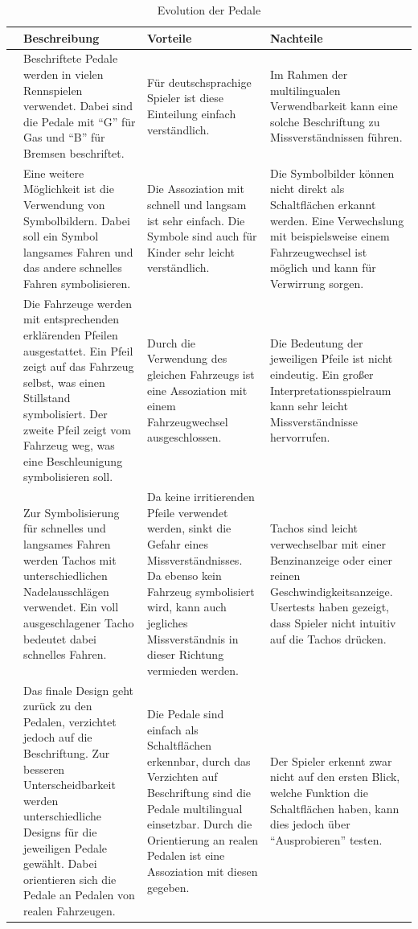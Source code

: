 	\begin{longtable}{cp{3.9cm}p{3.9cm}p{3.9cm}}%
		\toprule \endhead%
		\bottomrule \caption{Evolution der Pedale}\label{gasevo-tabelle} \endlastfoot%
			 & Beschreibung & Vorteile & Nachteile \\ \midrule
			\pedaleSchrift 		& Beschriftete Pedale werden in vielen Rennspielen verwendet. Dabei sind die Pedale mit \enquote{G} für Gas und \enquote{B} für Bremsen beschriftet. & Für deutschsprachige Spieler ist diese Einteilung einfach verständlich. & Im Rahmen der multilingualen Verwendbarkeit kann eine solche Beschriftung zu Missverständnissen führen. \\%
			\symbolbild 		& Eine weitere Möglichkeit ist die Verwendung von Symbolbildern. Dabei soll ein Symbol langsames Fahren und das andere schnelles Fahren symbolisieren. & Die Assoziation mit schnell und langsam ist sehr einfach. Die Symbole sind auch für Kinder sehr leicht verständlich. & Die Symbolbilder können nicht direkt als Schaltflächen erkannt werden. Eine Verwechslung mit beispielsweise einem Fahrzeugwechsel ist möglich und kann für Verwirrung sorgen.  \\%
			\autoPfeil 			&  Die Fahrzeuge werden mit entsprechenden erklärenden Pfeilen ausgestattet. Ein Pfeil zeigt auf das Fahrzeug selbst, was einen Stillstand symbolisiert. Der zweite Pfeil zeigt vom Fahrzeug weg, was eine Beschleunigung symbolisieren soll. & Durch die Verwendung des gleichen Fahrzeugs ist eine Assoziation mit einem Fahrzeugwechsel ausgeschlossen. & Die Bedeutung der jeweiligen Pfeile ist nicht eindeutig. Ein großer Interpretationsspielraum kann sehr leicht Missverständnisse hervorrufen. \\%
			\tacho 				& Zur Symbolisierung für schnelles und langsames Fahren werden Tachos mit unterschiedlichen Nadelausschlägen verwendet. Ein voll ausgeschlagener Tacho bedeutet dabei schnelles Fahren. & Da keine irritierenden Pfeile verwendet werden, sinkt die Gefahr eines Missverständnisses. Da ebenso kein Fahrzeug symbolisiert wird, kann auch jegliches Missverständnis in dieser Richtung vermieden werden. & Tachos sind leicht verwechselbar mit einer Benzinanzeige oder einer reinen Geschwindigkeitsanzeige. Usertests haben gezeigt, dass Spieler nicht intuitiv auf die Tachos drücken. \\%
			\pedaleRealistisch 	& Das finale Design geht zurück zu den Pedalen, verzichtet jedoch auf die Beschriftung. Zur besseren Unterscheidbarkeit werden unterschiedliche Designs für die jeweiligen Pedale gewählt. Dabei orientieren sich die Pedale an Pedalen von realen Fahrzeugen. & Die Pedale sind einfach als Schaltflächen erkennbar, durch das Verzichten auf Beschriftung sind die Pedale multilingual einsetzbar. Durch die Orientierung an realen Pedalen ist eine Assoziation mit diesen gegeben. & Der Spieler erkennt zwar nicht auf den ersten Blick, welche Funktion die Schaltflächen haben, kann dies jedoch über \enquote{Ausprobieren} testen. \\%
	\end{longtable}
